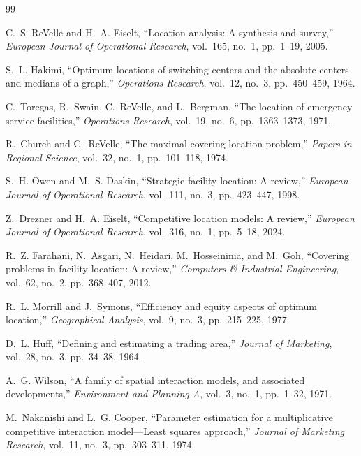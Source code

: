 \documentclass[conference]{IEEEtran}
\begin{document}
\begin{thebibliography}{99}

C.~S. ReVelle and H.~A. Eiselt, ``Location analysis: A synthesis and
survey,'' \textit{European Journal of Operational Research}, vol.~165,
no.~1, pp.~1--19, 2005.

S.~L. Hakimi, ``Optimum locations of switching centers and the absolute
centers and medians of a graph,'' \textit{Operations Research},
vol.~12, no.~3, pp.~450--459, 1964.

C.~Toregas, R.~Swain, C.~ReVelle, and L.~Bergman, ``The location of
emergency service facilities,'' \textit{Operations Research}, vol.~19,
no.~6, pp.~1363--1373, 1971.

R.~Church and C.~ReVelle, ``The maximal covering location problem,''
\textit{Papers in Regional Science}, vol.~32, no.~1, pp.~101--118,
1974.

S.~H. Owen and M.~S. Daskin, ``Strategic facility location: A review,''
\textit{European Journal of Operational Research}, vol.~111, no.~3,
pp.~423--447, 1998.

Z.~Drezner and H.~A. Eiselt, ``Competitive location models: A review,''
\textit{European Journal of Operational Research}, vol.~316, no.~1,
pp.~5--18, 2024.

R.~Z. Farahani, N.~Asgari, N.~Heidari, M.~Hosseininia, and M.~Goh,
``Covering problems in facility location: A review,''
\textit{Computers \& Industrial Engineering}, vol.~62, no.~2,
pp.~368--407, 2012.

R.~L. Morrill and J.~Symons, ``Efficiency and equity aspects of optimum
location,'' \textit{Geographical Analysis}, vol.~9, no.~3,
pp.~215--225, 1977.

D.~L. Huff, ``Defining and estimating a trading area,''
\textit{Journal of Marketing}, vol.~28, no.~3, pp.~34--38, 1964.

A.~G. Wilson, ``A family of spatial interaction models, and associated
developments,'' \textit{Environment and Planning A}, vol.~3, no.~1,
pp.~1--32, 1971.

M.~Nakanishi and L.~G. Cooper, ``Parameter estimation for a
multiplicative competitive interaction model---Least squares approach,''
\textit{Journal of Marketing Research}, vol.~11, no.~3,
pp.~303--311, 1974.


\end{thebibliography}
\end{document}
